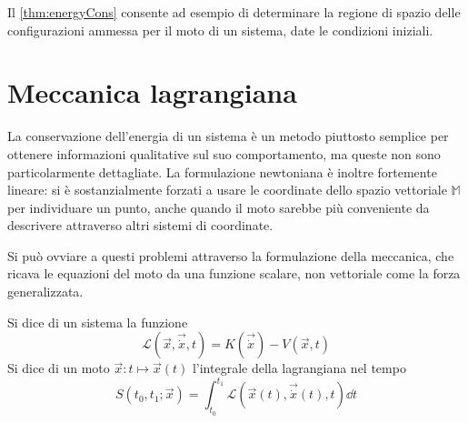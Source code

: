 Il \autoref{thm:energyCons} consente ad esempio di determinare la regione di spazio delle configurazioni ammessa per il moto di un sistema, date le condizioni iniziali.

\section{Meccanica lagrangiana}
La conservazione dell'energia di un sistema è un metodo piuttosto semplice per ottenere informazioni qualitative sul suo comportamento, ma queste non sono particolarmente dettagliate. La formulazione newtoniana è inoltre fortemente lineare: si è sostanzialmente forzati a usare le coordinate dello spazio vettoriale $\mathbb{M}$ per individuare un punto, anche quando il moto sarebbe più conveniente da descrivere attraverso altri sistemi di coordinate.

Si può ovviare a questi problemi attraverso la formulazione  della meccanica, che ricava le equazioni del moto da una funzione scalare, non vettoriale come la forza generalizzata.

\begin{definition}
  Si dice  di un sistema la funzione \begin{equation}
  \mathcal{L}(\vec{x},\vec{\dot{x}},t) = K(\vec{\dot{x}}) - V(\vec{x},t)
  \end{equation} 
  Si dice  di un moto $\vec{x}:t\mapsto \vec{x}(t)$ l'integrale della lagrangiana nel tempo \begin{equation} \label{eq:action}
  S(t_0,t_1; \vec{x}) = \int_{t_0}^{t_1} \mathcal{L}(\vec{x}(t),\vec{\dot{x}}(t),t) \dd{t}
  \end{equation}
\end{definition}

